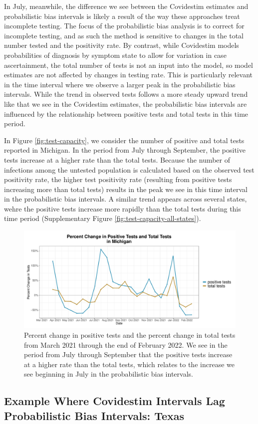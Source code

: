 \documentclass[12pt,twoside]{smiththesis}
\begin{document}
In July, meanwhile, the difference we see between the Covidestim estimates and probabilistic bias intervals is likely a result of the way these approaches treat incomplete testing. The focus of the probabilistic bias analysis is to correct for incomplete testing, and as such the method is sensitive to changes in the total number tested and the positivity rate. By contrast, while Covidestim models probabilities of diagnosis by symptom state to allow for variation in case ascertainment, the total number of tests is not an input into the model, so model estimates are not affected by changes in testing rate. This is particularly relevant in the time interval where we observe a larger peak in the probabilistic bias intervals. While the trend in observed tests follows a more steady upward trend like that we see in the Covidestim estimates, the probabilistic bias intervals are influenced by the relationship between positive tests and total tests in this time period.

In Figure \ref{fig:test-capacity}, we consider the number of positive and total tests reported in Michigan. In the period from July through September, the positive tests increase at a higher rate than the total tests. Because the number of infections among the untested population is calculated based on the observed test positivity rate, the higher test positivity rate (resulting from positive tests increasing more than total tests) results in the peak we see in this time interval in the probabilistic bias intervals. A similar trend appears across several states, wehre the positive tests increase more rapidly than the total tests during this time period (Supplementary Figure \ref{fig:test-capacity-all-states}).
\begin{figure}
\includegraphics[width=1\linewidth]{figure/test_capacity} \caption{\label{fig:test-capacity} Percent change in positive tests and the percent change in total tests from March 2021 through the end of February 2022. We see in the period from July through September that the positive tests increase at a higher rate than the total tests, which relates to the increase we see beginning in July in the probabilistic bias intervals.}\label{fig:unnamed-chunk-79}
\end{figure}
\hypertarget{example-where-covidestim-intervals-lag-probabilistic-bias-intervals-texas}{%
\subsection{Example Where Covidestim Intervals Lag Probabilistic Bias Intervals: Texas}\label{example-where-covidestim-intervals-lag-probabilistic-bias-intervals-texas}}
\end{document}
